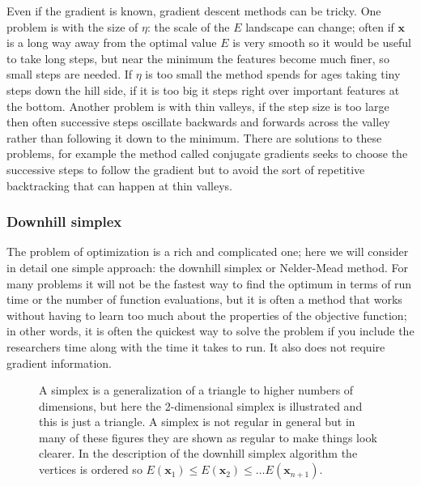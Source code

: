\documentclass[11pt,a4paper]{scrartcl}
\begin{document}
Even if the gradient is known, gradient descent methods can be
tricky. One problem is with the size of $\eta$: the scale of the $E$
landscape can change; often if $\mathbf{x}$ is a long way away from
the optimal value $E$ is very smooth so it would be useful to take
long steps, but near the minimum the features become much finer, so
small steps are needed. If $\eta$ is too small the method spends for
ages taking tiny steps down the hill side, if it is too big it steps
right over important features at the bottom. Another problem is with
thin valleys, if the step size is too large then often successive
steps oscillate backwards and forwards across the valley rather than
following it down to the minimum. There are solutions to these
problems, for example the method called conjugate gradients seeks to
choose the successive steps to follow the gradient but to avoid the
sort of repetitive backtracking that can happen at thin valleys.

\subsubsection*{Downhill simplex}

The problem of optimization is a rich and complicated one; here we
will consider in detail one simple approach: the downhill simplex or
Nelder-Mead method. For many problems it will not be the fastest way
to find the optimum in terms of run time or the number of function
evaluations, but it is often a method that works without having to
learn too much about the properties of the objective function; in
other words, it is often the quickest way to solve the problem if you
include the researchers time along with the time it takes to run. It
also does not require gradient information.

\begin{figure}
\begin{center}
\end{center}
\caption{A simplex is a generalization of a triangle to higher numbers
  of dimensions, but here the 2-dimensional simplex is illustrated and
  this is just a triangle. A simplex is not regular in general but in
  many of these figures they are shown as regular to make things look
  clearer. In the description of the downhill simplex algorithm the
  vertices is ordered so $E(\mathbf{x}_1)\le E(\mathbf{x}_2)\le \ldots
  E(\mathbf{x}_{n+1})$.\label{fig:simplex}}
\end{figure}
\end{document}
